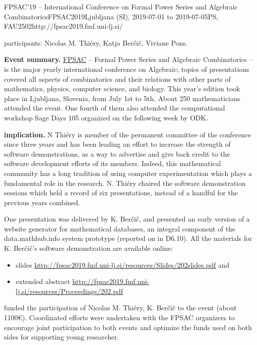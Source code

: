 \begin{event}{FPSAC'19 -- International Conference on Formal Power Series and Algebraic Combinatorics}{FPSAC2019}{Ljubljana (SI),
  2019-07-01 to
  2019-07-05}{PS, FAU}{250}{2}{http://fpsac2019.fmf.uni-lj.si/}

\ODK participants: Nicolas M. Thi\'ery, Katja Ber\v{c}i\v{c}, Viviane
Pons.

\textbf{Event summary.} \href{http://fpsac.org}{FPSAC} -- Formal Power
Series and Algebraic Combinatorics -- is the major yearly
international conference on Algebraic; topics of presentations covered
all aspects of combinatorics and their relations with other parts of
mathematics, physics, computer science, and biology. This year's
edition took place in Ljubljana, Slovenia, from July 1st to 5th. About
250 mathematicians attended the event. One fourth of them also
attended the computational workshop Sage Days 105 organized on the
following week by ODK.

\textbf{\ODK implication.} N Thiéry is member of the permanent
committee of the conference since three years and has been leading an
effort to increase the strength of software demonstrations, as a way
to advertise and give back credit to the software development efforts
of its members. Indeed, this mathematical community has a long
tradition of using computer experimentation which plays a fundamental
role in the research. N. Thiéry chaired the software demonstration
sessions which held a record of six presentations, instead of a
handful for the previous years combined.

One presentation was delivered by K. Ber\v{c}i\v{c}, and presented an
early version of a website generator for mathematical databases, an
integral component of the \textsf{data.math\-hub.info} system
prototype (reported on in D6.10). All the materials for K.
Ber\v{c}i\v{c}'s software demonstration are available online:
\begin{itemize}
\item slides \url{http://fpsac2019.fmf.uni-lj.si/resources/Slides/202slides.pdf} and
\item extended abstract \url{http://fpsac2019.fmf.uni-lj.si/resources/Proceedings/202.pdf}
\end{itemize}

\ODK funded the participation of Nicolas M. Thiéry, K. Ber\v{c}i\v{c}
to the event (about 1100\euro). Coordinated efforts were undertaken
with the FPSAC organizers to encourage joint participation to both
events and optimize the funds used on both sides for supporting young
researcher.


\end{event}
